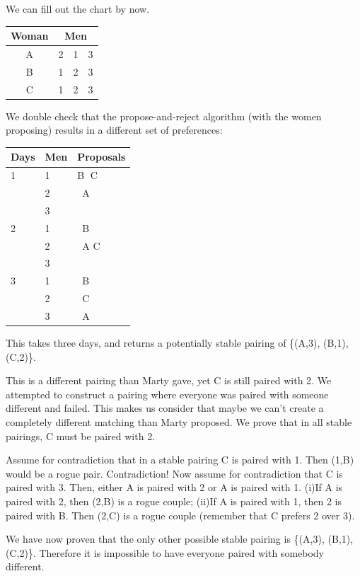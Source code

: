 \documentclass[11pt]{article}
\begin{document}
\begin{qunlist}
\begin{itemize}
{We can fill out the chart by now.
\begin{center}
\begin{tabular}{|c|ccc|}\hline 
Woman&\multicolumn{3}{|c|}{Men}\\\hline 
A&2&1&3\\\hline 
B&1&2&3\\\hline 
C&1&2&3\\\hline
\end{tabular}
\end{center}

We double check that the propose-and-reject algorithm (with the women proposing) 
results in a different set of preferences:
\begin{center}
    \begin{tabular}{| l | l | l |}
    \hline
    Days & Men & Proposals \\ \hline
     1 & 1 & \textcircled{B} C \\ 
       & 2 & \ A \\ 
       & 3 &  \\ \hline
     2 & 1 & \ B \\ 
       & 2 &   \ A \textcircled{C} \\ 
       & 3 &  \\ \hline
     3 & 1 & \ B \\ 
       & 2 & \ C\\ 
       & 3 & \ A \\ \hline
    \end{tabular}
\end{center}
This takes three days, and returns a potentially stable pairing of \{(A,3), (B,1), (C,2)\}.

This is a different pairing than Marty gave, yet C is still paired with 2. 
We attempted to construct a pairing where everyone was paired with someone different and failed. 
This makes us consider that maybe we can't create a completely different matching than Marty proposed. 
We prove that in all stable pairings, C must be paired with 2.
 
Assume for contradiction that in a stable pairing C is paired with 1. 
Then (1,B) would be a rogue pair. Contradiction!
Now assume for contradiction that C is paired with 3. 
Then, either A is paired with 2 or A is paired with 1. 
(i)If A is paired with 2, then (2,B) is a rogue couple; 
(ii)If A is paired with 1, then 2 is paired with B. 
Then (2,C) is a rogue couple (remember that C prefers 2 over 3).

We have now proven that the only other possible stable pairing is 
\{(A,3), (B,1), (C,2)\}.
Therefore it is impossible to have everyone paired with somebody different.
}
\fi



\end{itemize}
\end{qunlist}
\end{document}
